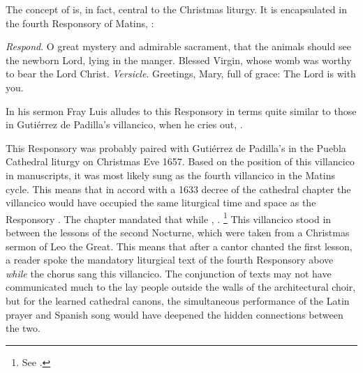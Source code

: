 The concept of  is, in fact, central to the Christmas liturgy.
It is encapsulated in the fourth Responsory of Matins, :
\begin{quoting}
    \emph{Respond}. O great mystery and admirable sacrament, that the animals
    should see the newborn Lord, lying in the manger.
    Blessed Virgin, whose womb was worthy to bear the Lord Christ.\newline
    \emph{Versicle}. Greetings, Mary, full of grace: The Lord is with you.%
        \Autocite 
        [175: .]
        {Catholic:Breviarium1631}
\end{quoting}
In his sermon Fray Luis alludes to this Responsory in terms quite similar to
those in Gutiérrez de Padilla's villancico, when he cries out, .%
    \Autocite
    [38: ]
    {LuisdeGranada:Xmas}

This Responsory was probably paired with Gutiérrez de Padilla's  in the Puebla Cathedral liturgy on Christmas Eve 1657.
Based on the position of this villancico in manuscripts, it was most likely
sung as the fourth villancico in the Matins cycle.
This means that in accord with a 1633 decree of the cathedral chapter the
villancico would have occupied the same liturgical time and space as the
Responsory .
The chapter mandated that while , .%
    \footnote{See .}
This villancico stood in between the lessons of the second Nocturne, which were
taken from a Christmas sermon of Leo the Great.
This means that after a cantor chanted the first lesson, a reader spoke the
mandatory liturgical text of the fourth Responsory above \emph{while} the chorus
sang this villancico.
The conjunction of texts may not have communicated much to the lay people
outside the walls of the architectural choir, but for the learned cathedral
canons, the simultaneous performance of the Latin prayer and Spanish song would
have deepened the hidden connections between the two.

